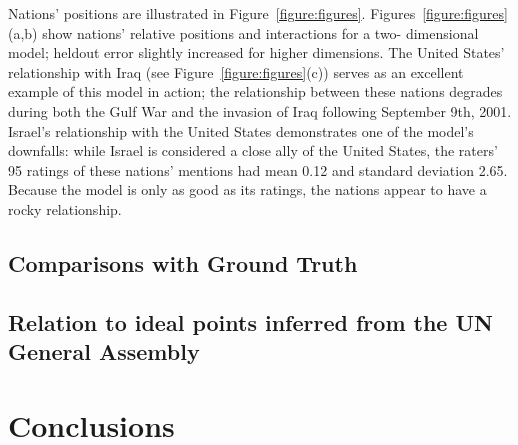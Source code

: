 Nations' positions are illustrated in Figure~\ref{figure:figures}.
Figures~\ref{figure:figures}(a,b) show nations' relative positions
and interactions for a two- dimensional model; heldout error slightly
increased for higher dimensions. The United States' relationship with
Iraq (see Figure~\ref{figure:figures}(c)) serves as an excellent
example of this model in action; the relationship between these
nations degrades during both the Gulf War and the invasion of Iraq
following September 9th, 2001.  Israel's relationship with the United
States demonstrates one of the model's downfalls: while Israel is
considered a close ally of the United States, the raters' 95 ratings
of these nations' mentions had mean 0.12 and standard deviation
2.65.  Because the model is only as good as its ratings, the nations
appear to have a rocky relationship.







\subsection{Comparisons with Ground Truth}

\subsection{Relation to ideal points inferred from the UN General Assembly}

\section*{Conclusions}
